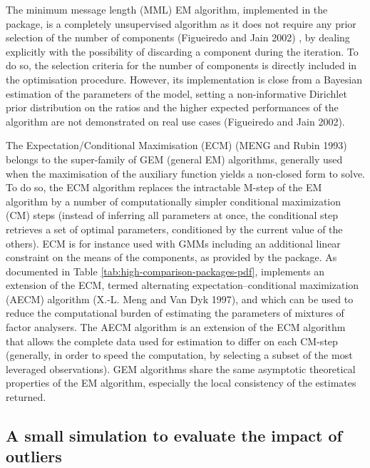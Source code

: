 The minimum message length (MML) EM algorithm, implemented in the
 package, is a completely unsupervised algorithm as it
does not require any prior selection of the number of components
(Figueiredo and Jain 2002) , by dealing explicitly with the possibility of
discarding a component during the iteration. To do so, the selection
criteria for the number of components is directly included in the
optimisation procedure. However, its implementation is close from a
Bayesian estimation of the parameters of the model, setting a
non-informative Dirichlet prior distribution on the ratios and the
higher expected performances of the algorithm are not demonstrated on
real use cases (Figueiredo and Jain 2002).

The Expectation/Conditional Maximisation (ECM) (MENG and Rubin 1993) belongs to the super-family of GEM (general EM) algorithms, generally used when the maximisation of the auxiliary function yields a non-closed form to solve. To do so, the ECM algorithm replaces the intractable M-step of the EM algorithm by a number of computationally simpler conditional maximization (CM) steps (instead of inferring all parameters at once, the conditional step retrieves a set of optimal parameters, conditioned by the current value of the others). ECM is for instance used with GMMs including an additional linear constraint on the means of the components, as provided by the 
package. As documented in Table \ref{tab:high-comparison-packages-pdf},  implements an extension of the ECM, termed alternating expectation--conditional maximization (AECM) algorithm (X.-L. Meng and Van Dyk 1997), and which can be used to reduce the computational burden of estimating the parameters of mixtures of factor analysers. The AECM algorithm is an extension of the ECM algorithm that allows the complete data used for estimation to differ on each CM-step (generally, in order to speed the computation, by selecting a subset of the most leveraged observations). GEM algorithms share the same asymptotic theoretical properties of the EM algorithm, especially the local consistency of the estimates returned.

\hypertarget{a-small-simulation-to-evaluate-the-impact-of-outliers}{%
\subsection{A small simulation to evaluate the impact of outliers}\label{a-small-simulation-to-evaluate-the-impact-of-outliers}}

